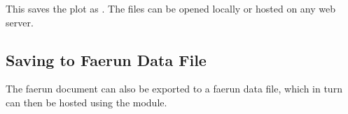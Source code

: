 \documentclass[letterpaper,10pt,english]{sphinxmanual}
\begin{document}
\begin{sphinxVerbatim}[commandchars=\\\{\}]
\end{sphinxVerbatim}

This saves the plot as . The files can be opened locally or hosted on any web server.

\noindent{}


\subsection{Saving to Faerun Data File}
\label{\detokenize{tutorial:saving-to-faerun-data-file}}
The faerun document can also be exported to a faerun data file, which in turn can then be hosted using the  module.

\begin{sphinxVerbatim}[commandchars=\\\{\}]
 

    
      
\end{sphinxVerbatim}
\end{document}
